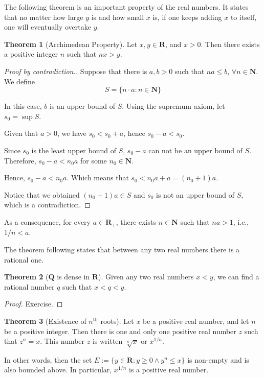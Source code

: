 \documentclass[12pt,a4paper]{article}
\theoremstyle{definition}
\newtheorem{theorem}{Theorem}[section]
\begin{document}

The following theorem is an important property of the real numbers. It states that no matter how large $y$ is and how small $x$ is, if one keeps adding $x$ to itself, one will eventually overtake $y$.

\begin{theorem}[Archimedean Property]
  Let $x, y \in \textbf{R}$, and $x > 0$. Then there exists a positive integer $n$ such that $nx > y$.
\end{theorem}

\begin{proof}[Proof by contradiction.]
	Suppose that there is $a,b > 0$ such that $na \leq b$, $\forall n \in \textbf{N}$. We define \[ S = \{ n \cdot a : n \in \textbf{N} \} \]
	
	In this case, $b$ is an upper bound of $S$. Using the supremum axiom, let $s_0 = \sup S$.
	
	Given that $a > 0$, we have $s_0 < s_0 + a$, hence $s_0 - a < s_0$.
	
	Since $s_0$ is the least upper bound of $S$, $s_0 - a$ can not be an upper bound of $S$. Therefore, $s_0 - a < n_0 a$ for some $n_0 \in \textbf{N}$.
	
	Hence, $s_0 - a < n_0 a$. Which means that $s_0 < n_0 a + a = (n_0 + 1) a$.
	
	Notice that we obtained $(n_0 + 1)a \in S$ and $s_0$ is not an upper bound of $S$, which is a contradiction.
\end{proof}

As a consequence, for every $a \in \textbf{R}_+$, there exists $n \in \textbf{N}$ such that $n a > 1$, i.e., $1/n < a$.

The theorem following states that between any two real numbers there is a rational one.

\begin{theorem}[$\textbf{Q}$ is dense in $\textbf{R}$]
  Given any two real numbers $x < y$, we can find a rational number $q$ such that $x < q < y$.
\end{theorem}

\begin{proof} 
	Exercise. %
\end{proof}

\begin{theorem}[Existence of $n^\text{th}$ roots]
  Let $x$ be a positive real number, and let $n$ be a positive integer. Then there is one and only one positive real number $z$ such that $z^n = x$. This number $z$ is written $\sqrt[n]{x}$ or $x^{1/n}$.
  
  In other words, then the set $E := \{y \in \textbf{R} : y \geq 0 \land y^n \leq x \}$ is non-empty and is also bounded above. In particular, $x^{1/n}$ is a positive real number.
\end{theorem}
\end{document}
